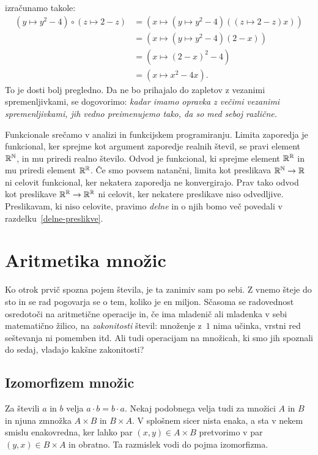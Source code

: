 %
izračunamo takole:
%
\begin{align*}
  (y \mapsto y^2  - 4) \circ (z \mapsto 2 - z)
  &= (x \mapsto (y \mapsto y^2 - 4) ((z \mapsto 2 - z) x)) \\
  &= (x \mapsto (y \mapsto y^2 - 4) (2 - x)) \\
  &= (x \mapsto (2 - x)^2 - 4) \\
  &= (x \mapsto x^2 - 4 x).
\end{align*}
%
To je dosti bolj pregledno. Da ne bo prihajalo do zapletov z vezanimi spremenljivkami, se
dogovorimo: \emph{kadar imamo opravka z večimi vezanimi spremenljivkami, jih vedno
  preimenujemo tako, da so med seboj različne.}

Funkcionale srečamo v analizi in funkcijskem programiranju. Limita zaporedja je
funkcional, ker sprejme kot argument zaporedje realnih števil, se pravi element $\mathbb{R}^{\mathbb{N}}$,
in mu priredi realno število. Odvod je funkcional, ki sprejme element $\mathbb{R}^{\mathbb{R}}$ in mu
priredi element $\mathbb{R}^{\mathbb{R}}$. Če smo povsem natančni, limita kot preslikava $\mathbb{R}^{\mathbb{N}} \to \mathbb{R}$
ni celovit funkcional, ker nekatera zaporedja ne konvergirajo. Prav tako odvod kot
preslikave $\mathbb{R}^{\mathbb{R}} \to \mathbb{R}^{\mathbb{R}}$ ni celovit, ker nekatere preslikave niso odvedljive.
Preslikavam, ki niso celovite, pravimo \emph{delne} in o njih bomo več povedali v
razdelku~\ref{delne-preslikve}.

\section{Aritmetika množic}
\label{sec:aritmetika-mnozic}

Ko otrok prvič spozna pojem števila, je ta zanimiv sam po sebi. Z vnemo šteje do sto in se
rad pogovarja se o tem, koliko je en miljon. Sčasoma se radovednost osredotoči na
aritmetične operacije in, če ima mladenič ali mladenka v sebi matematično žilico, na
\emph{zakonitosti} števil: množenje z~$1$ nima učinka, vrstni red seštevanja ni pomemben
itd. Ali tudi operacijam na množicah, ki smo jih spoznali do sedaj, vladajo kakšne
zakonitosti?

\subsection{Izomorfizem množic}
\label{sec:izomorfizem-mnozic}

Za števili $a$ in $b$ velja $a \cdot b = b \cdot a$. Nekaj podobnega velja tudi za množici
$A$ in $B$ in njuna zmnožka $A \times B$ in $B \times A$. V splošnem sicer nista enaka, a
sta v nekem smislu enakovredna, ker lahko par $(x, y) \in A \times B$ pretvorimo v par
$(y, x) \in B \times A$ in obratno. Ta razmislek vodi do pojma izomorfizma.

